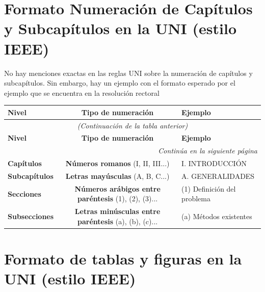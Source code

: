 \documentclass{report}
\newcommand{\greencheck}{{\color{green}\ding{51}}} %
\begin{document}
\section*{\color{red}Formato Numeración de Capítulos y Subcapítulos en la UNI (estilo IEEE) \greencheck}

No hay menciones exactas en las reglas UNI sobre la numeración de capítulos y subcapítulos. Sin embargo, hay un ejemplo con el formato esperado por el ejemplo que se encuentra en la resolución rectoral


\begin{longtable}{|l|c|l|}
    \hline
    \textbf{Nivel} & \textbf{Tipo de numeración} & \textbf{Ejemplo} \\ \hline
    \endfirsthead

    \multicolumn{3}{c}{{\textit{(Continuación de la tabla anterior)}}} \\ \hline
    \textbf{Nivel} & \textbf{Tipo de numeración} & \textbf{Ejemplo} \\ \hline
    \endhead

    \hline \multicolumn{3}{|r|}{{\textit{Continúa en la siguiente página}}} \\ \hline
    \endfoot

    \hline
    \endlastfoot

    \textbf{Capítulos} & \textbf{Números romanos} (I, II, III...) & I. INTRODUCCIÓN \\ \hline

    \textbf{Subcapítulos} & \textbf{Letras mayúsculas} (A, B, C...) & A. GENERALIDADES \\ \hline

    \textbf{Secciones} & \textbf{Números arábigos entre paréntesis} (1), (2), (3)... & (1) Definición del problema \\ \hline

    \textbf{Subsecciones} & \textbf{Letras minúsculas entre paréntesis} (a), (b), (c)... & (a) Métodos existentes \\ \hline
\end{longtable}

\section*{\color{red}Formato de tablas y figuras en la UNI (estilo IEEE)}
\end{document}
